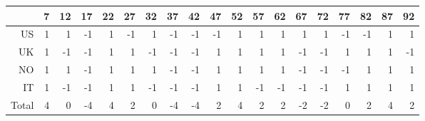 \begin{table}[ht]
\centering
\begin{tabular}{rrrrrrrrrrrrrrrrrrr}
  \hline
 & 7 & 12 & 17 & 22 & 27 & 32 & 37 & 42 & 47 & 52 & 57 & 62 & 67 & 72 & 77 & 82 & 87 & 92 \\ 
  \hline
US & 1 & 1 & -1 & 1 & -1 & 1 & -1 & -1 & -1 & 1 & 1 & 1 & 1 & 1 & -1 & -1 & 1 & 1 \\ 
  UK & 1 & -1 & -1 & 1 & 1 & -1 & -1 & -1 & 1 & 1 & 1 & 1 & -1 & -1 & 1 & 1 & 1 & -1 \\ 
  NO & 1 & 1 & -1 & 1 & 1 & 1 & -1 & -1 & 1 & 1 & 1 & 1 & -1 & -1 & -1 & 1 & 1 & 1 \\ 
  IT & 1 & -1 & -1 & 1 & 1 & -1 & -1 & -1 & 1 & 1 & -1 & -1 & -1 & -1 & 1 & 1 & 1 & 1 \\ 
  Total & 4 & 0 & -4 & 4 & 2 & 0 & -4 & -4 & 2 & 4 & 2 & 2 & -2 & -2 & 0 & 2 & 4 & 2 \\ 
   \hline
\end{tabular}
\end{table}
